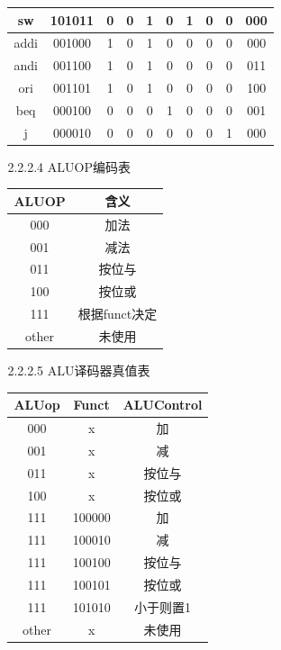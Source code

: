 \documentclass[UTF8]{article}
\begin{document}
\begin{enumerate}
\begin{enumerate}
\begin{enumerate}
{\begin{tabular}{|c|c|c|c|c|c|c|c|c|c|}
								sw   & 101011 & 0 & 0 & 1 & 0 & 1 & 0 & 0 & 000 \\ \hline 
								addi & 001000 & 1 & 0 & 1 & 0 & 0 & 0 & 0 & 000 \\ \hline 
								andi & 001100 & 1 & 0 & 1 & 0 & 0 & 0 & 0 & 011 \\ \hline 
								ori  & 001101 & 1 & 0 & 1 & 0 & 0 & 0 & 0 & 100 \\ \hline 
								beq  & 000100 & 0 & 0 & 0 & 1 & 0 & 0 & 0 & 001 \\ \hline 
								j    & 000010 & 0 & 0 & 0 & 0 & 0 & 0 & 1 & 000 \\ \hline 
							\end{tabular}}
						\item [2.2.2.4] ALUOP编码表\\
							\begin{tabular}{|c|c|} \hline
								ALUOP & 含义          \\ \hline 
								000   & 加法          \\ \hline 
								001   & 减法          \\ \hline 
								011   & 按位与        \\ \hline 
								100   & 按位或        \\ \hline 
								111   & 根据funct决定 \\ \hline 
								other & 未使用        \\ \hline 
							\end{tabular}
						\item [2.2.2.5] ALU译码器真值表\\
							\begin{tabular}{|c|c|c|} \hline
								ALUop & Funct  & ALUControl\\ \hline 
								000   & x      & 加        \\ \hline 
								001   & x      & 减        \\ \hline 
								011   & x      & 按位与    \\ \hline 
								100   & x      & 按位或    \\ \hline 
								111   & 100000 & 加        \\ \hline 
								111   & 100010 & 减        \\ \hline 
								111   & 100100 & 按位与    \\ \hline 
								111   & 100101 & 按位或    \\ \hline 
								111   & 101010 & 小于则置1 \\ \hline 
								other & x      & 未使用    \\ \hline 

\end{tabular}
\end{enumerate}
\end{enumerate}
\end{enumerate}
\end{document}
